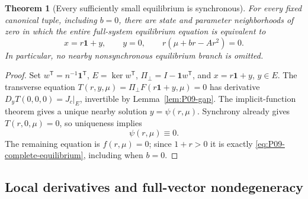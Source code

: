 \documentclass[11pt]{article}
\let\OriginalCite\cite
\renewcommand{\cite}[2][]{%
  \textcolor{CitationRed}{%
    \if\relax\detokenize{#1}\relax
      \OriginalCite{#2}%
    \else
      \OriginalCite[#1]{#2}%
    \fi}}
\newcommand{\one}{\mathbf{1}}
\newtheorem{theorem}{Theorem}[section]
\theoremstyle{definition}
\theoremstyle{remark}
\begin{document}
\begin{theorem}[Every sufficiently small equilibrium is synchronous]
\label{thm:P09-reduction}
For every fixed canonical tuple, including $b=0$, there are state and
parameter neighborhoods of zero in which the entire full-system
equilibrium equation is equivalent to
\begin{equation}
 x=r\one+y,\qquad y=0,\qquad r(\mu+br-Ar^2)=0.
 \label{eq:P09-complete-equilibrium}
\end{equation}
In particular, no nearby nonsynchronous equilibrium branch is omitted.
\end{theorem}
\begin{proof}
Set $w^{\mathsf T}=n^{-1}\one^{\mathsf T}$,
$E=\ker w^{\mathsf T}$, $\Pi_\perp=I-\one w^{\mathsf T}$,
and $x=r\one+y$, $y\in E$. The transverse equation
$T(r,y,\mu)=\Pi_\perp F(r\one+y,\mu)=0$ has derivative
$D_yT(0,0,0)=J_c|_E$, invertible by Lemma~\ref{lem:P09-gap}.
The implicit-function theorem \cite[Ch.~1]{GuckenheimerHolmes1983}
gives a unique nearby solution $y=\psi(r,\mu)$. Synchrony already
gives $T(r,0,\mu)=0$, so uniqueness implies
\begin{equation}\psi(r,\mu)\equiv0.\label{eq:P09-psi-zero}\end{equation}
The remaining equation is $f(r,\mu)=0$; since $1+r>0$ it is
exactly \eqref{eq:P09-complete-equilibrium}, including when $b=0$.
\end{proof}

\subsection{Local derivatives and full-vector nondegeneracy}
\end{document}

